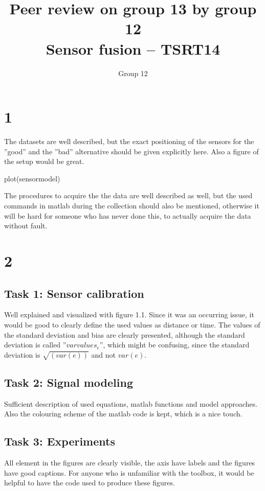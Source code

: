 \documentclass[10pt,a4paper]{report}
\begin{document}
\title{Peer review on group 13 by group 12\\Sensor fusion -- TSRT14}
\author{Group 12}
\maketitle

\newpage
\section*{1}
The datasets are well described, but the exact positioning of the sensors for the ''good'' and the ''bad'' alternative should be given explicitly here. Also a figure of the setup would be great.
\begin{verbatim*}
plot(sensormodel)
\end{verbatim*}
The procedures to acquire the the data are well described as well, but the used commands in matlab during the collection should also be mentioned, otherwise it will be hard for someone who has never done this, to actually acquire the data without fault.



\section*{2}
\subsection*{Task 1: Sensor calibration}
Well explained and visualized with figure 1.1. Since it was an occurring issue, it would be good to clearly define the used values as distance or time. The values of the standard deviation and bias are clearly presented, although the standard deviation is called ''$varvalues_e$'', which might be confusing, since the standard deviation is $\sqrt{(var(e))}$ and not $var(e)$. 



\subsection*{Task 2: Signal modeling}
Sufficient description of used equations, matlab functions and model approaches. Also the colouring scheme of the matlab code is kept, which is a nice touch.



\subsection*{Task 3: Experiments}
All element in the figures are clearly visible, the axis have labels and the figures have good captions. For anyone who is unfamiliar with the toolbox, it would be helpful to have the code used to produce these figures.
\end{document}
